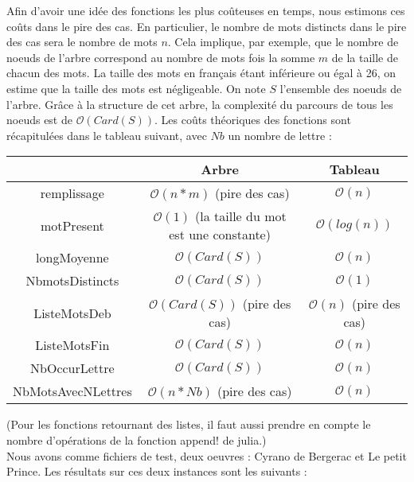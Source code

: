 \documentclass[a4paper,12pt]{article}
\begin{document}
Afin d'avoir une idée des fonctions les plus coûteuses en temps, nous estimons ces coûts dans le pire des cas. En particulier, le nombre de mots distincts dans le pire des cas sera le nombre de mots $n$. Cela implique, par exemple, que le nombre de noeuds de l'arbre correspond au nombre de mots fois la somme $m$ de la taille de chacun des mots. La taille des mots en français étant inférieure ou égal à 26, on estime que la taille des mots est négligeable. On note $S$ l'ensemble des noeuds de l'arbre. Grâce à la structure de cet arbre, la complexité du parcours de tous les noeuds est de $\mathcal{O}(Card(S))$.
Les coûts théoriques des fonctions sont récapitulées dans le tableau suivant, avec $Nb$ un nombre de lettre : 
\begin{center}
  \begin{tabular}{|c|c|c|}
	\hline
	 & Arbre & Tableau\\ 
	\hline
	remplissage & $\mathcal{O}(n * m)$ (pire des cas) & $\mathcal{O}(n)$\\	
	\hline
	motPresent & $\mathcal{O}(1)$ (la taille du mot est une constante)& $\mathcal{O}(log(n))$\\
	\hline
	longMoyenne & $\mathcal{O}(Card(S))$ & $\mathcal{O}(n)$\\
	\hline
	NbmotsDistincts & $\mathcal{O}(Card(S))$ & $\mathcal{O}(1)$\\
	\hline
	ListeMotsDeb & $\mathcal{O}(Card(S))$ (pire des cas) & $\mathcal{O}(n)$ (pire des cas)\\
	\hline
	ListeMotsFin & $\mathcal{O}(Card(S))$ & $\mathcal{O}(n)$\\
	\hline
	NbOccurLettre & $\mathcal{O}(Card(S))$ & $\mathcal{O}(n)$\\
	\hline
	NbMotsAvecNLettres & $\mathcal{O}(n * Nb)$ (pire des cas) & $\mathcal{O}(n)$\\
	\hline
   \end{tabular}
\end{center}
(Pour les fonctions retournant des listes, il faut aussi prendre en compte le nombre d'opérations de la fonction append! de julia.)\\ 

Nous avons comme fichiers de test, deux oeuvres : Cyrano de Bergerac et Le petit Prince.  
Les résultats sur ces deux instances sont les suivants :
\end{document}
